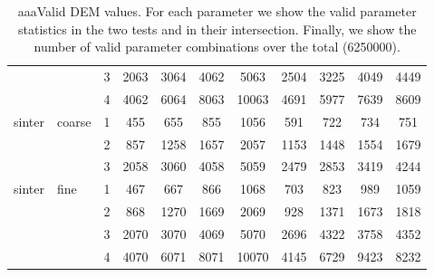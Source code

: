 \begin{table}
\begin{tabular}{ll|c|cccc|cccc}
          &       & 3     & 2063  & 3064  & 4062  & 5063  & 2504  & 3225  & 4049  & 4449 \\
          &       & 4     & 4062  & 6064  & 8063  & 10063 & 4691  & 5977  & 7639  & 8609 \\
\hline
    sinter & coarse & 1     & 455   & 655   & 855   & 1056  & 591   & 722   & 734   & 751 \\
          &       & 2     & 857   & 1258  & 1657  & 2057  & 1153  & 1448  & 1554  & 1679 \\
          &       & 3     & 2058  & 3060  & 4058  & 5059  & 2479  & 2853  & 3419  & 4244 \\
\hline
    sinter & fine  & 1     & 467   & 667   & 866   & 1068  & 703   & 823   & 989   & 1059 \\
          &       & 2     & 868   & 1270  & 1669  & 2069  & 928   & 1371  & 1673  & 1818 \\
          &       & 3     & 2070  & 3070  & 4069  & 5070  & 2696  & 4322  & 3758  & 4352 \\
          &       & 4     & 4070  & 6071  & 8071  & 10070 & 4145  & 6729  & 9423  & 8232 \\
       \hline
\end{tabular}
\caption[aaaValid DEM values]{aaaValid DEM values. For each parameter we show
the valid parameter statistics in the two tests and in their intersection.
Finally, we show the number of valid parameter combinations over the total
(6250000).}
\label{tab:21shearcell2}
\end{table}